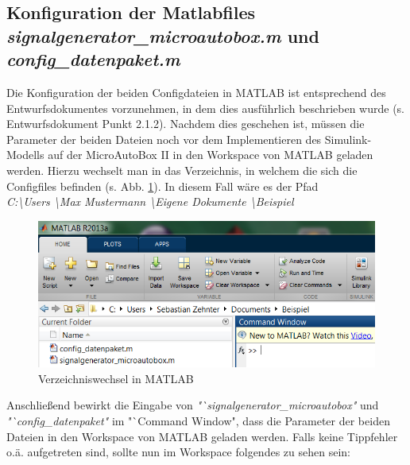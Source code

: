 \documentclass[fontsize = 12pt, paper = a4]{scrreprt}
\begin{document}

\subsection{Konfiguration der Matlabfiles \textit{signalgenerator\_microautobox.m} und \textit{config\_datenpaket.m}}

Die Konfiguration der beiden Configdateien in MATLAB ist entsprechend des Entwurfsdokumentes vorzunehmen, in dem dies ausführlich beschrieben wurde (s. Entwurfsdokument Punkt 2.1.2). Nachdem dies geschehen ist, müssen die Parameter der beiden Dateien noch vor dem Implementieren des Simulink-Modells auf der MicroAutoBox II in den Workspace von MATLAB geladen werden. Hierzu wechselt man in das Verzeichnis, in welchem die sich die Configfiles befinden (s. Abb. \ref{configfilespfad}). In diesem Fall wäre es der Pfad \\ \textit{C:\textbackslash Users \textbackslash Max Mustermann \textbackslash Eigene Dokumente \textbackslash Beispiel}


\begin{figure}[h]
\centering
\includegraphics[scale = 0.65]{configfilespfad}
\caption[Verzeichniswechsel in MATLAB]{Verzeichniswechsel in MATLAB}
\label{configfilespfad}
\end{figure} 

Anschließend bewirkt die Eingabe von \textit{"`signalgenerator\_microautobox"} und \textit{"`config\_datenpaket"} im "`Command Window", dass die Parameter der beiden Dateien in den Workspace von MATLAB geladen werden. Falls keine Tippfehler o.ä. aufgetreten sind, sollte nun im Workspace folgendes zu sehen sein: 
\end{document}
